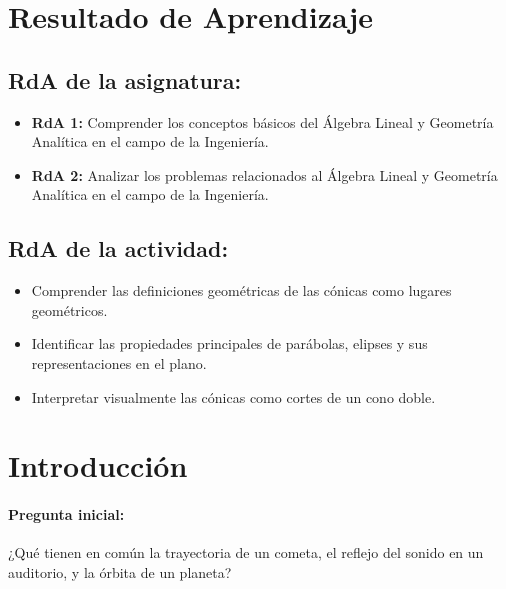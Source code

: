 \documentclass[a4,11pt]{aleph-notas}
\begin{document}
\encabezado

\section*{Resultado de Aprendizaje}

\subsection*{RdA de la asignatura:}
\begin{itemize}[leftmargin=*]
    \item \textbf{RdA 1:} Comprender los conceptos básicos del Álgebra Lineal y Geometría Analítica en el campo de la Ingeniería.
    \item \textbf{RdA 2:} Analizar los problemas relacionados al Álgebra Lineal y Geometría Analítica en el campo de la Ingeniería.
\end{itemize}

\subsection*{RdA de la actividad:}
\begin{itemize}[leftmargin=*]
    \item Comprender las definiciones geométricas de las cónicas como lugares geométricos.
    \item Identificar las propiedades principales de parábolas, elipses y sus representaciones en el plano.
    \item Interpretar visualmente las cónicas como cortes de un cono doble.
\end{itemize}

\section*{Introducción}

\paragraph{Pregunta inicial:}  
¿Qué tienen en común la trayectoria de un cometa, el reflejo del sonido en un auditorio, y la órbita de un planeta?
\end{document}
